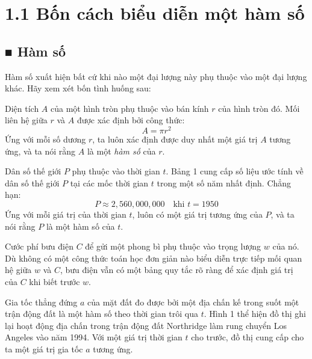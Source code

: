 \documentclass[10pt,a4paper]{article}
\begin{document}
\section*{1.1 Bốn cách biểu diễn một hàm số}

\subsection*{\color{stewartblue}■ Hàm số}

Hàm số xuất hiện bất cứ khi nào một đại lượng này phụ thuộc vào một đại lượng khác. Hãy xem xét bốn tình huống sau:

\begin{description}[leftmargin=1.8em, itemsep=0.3cm]
    \item[\textbf{A.}] Diện tích $A$ của một hình tròn phụ thuộc vào bán kính $r$ của hình tròn đó. Mối liên hệ giữa $r$ và $A$ được xác định bởi công thức:
    \[
    A = \pi r^2
    \]
    Ứng với mỗi số dương $r$, ta luôn xác định được duy nhất một giá trị $A$ tương ứng, và ta nói rằng $A$ là một \textit{hàm số} của $r$.

    \item[\textbf{B.}] Dân số thế giới $P$ phụ thuộc vào thời gian $t$. Bảng 1 cung cấp số liệu ước tính về dân số thế giới $P$ tại các mốc thời gian $t$ trong một số năm nhất định. Chẳng hạn:
    \[
    P \approx 2{,}560{,}000{,}000 \quad \text{khi } t = 1950
    \]
    Ứng với mỗi giá trị của thời gian $t$, luôn có một giá trị tương ứng của $P$, và ta nói rằng $P$ là một hàm số của $t$.

    \item[\textbf{C.}] Cước phí bưu điện $C$ để gửi một phong bì phụ thuộc vào trọng lượng $w$ của nó. Dù không có một công thức toán học đơn giản nào biểu diễn trực tiếp mối quan hệ giữa $w$ và $C$, bưu điện vẫn có một bảng quy tắc rõ ràng để xác định giá trị của $C$ khi biết trước $w$.

    \item[\textbf{D.}] Gia tốc thẳng đứng $a$ của mặt đất đo được bởi một địa chấn kế trong suốt một trận động đất là một hàm số theo thời gian trôi qua $t$. Hình 1 thể hiện đồ thị ghi lại hoạt động địa chấn trong trận động đất Northridge làm rung chuyển Los Angeles vào năm 1994. Với một giá trị thời gian $t$ cho trước, đồ thị cung cấp cho ta một giá trị gia tốc $a$ tương ứng.
\end{description}
\end{document}
